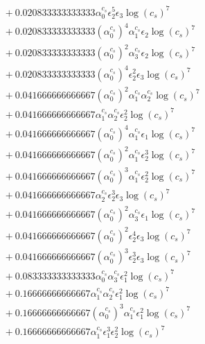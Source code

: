 \documentclass[10pt]{article}
\begin{document}
\begin{align*}
&{}  + 0.020833333333333 \alpha_{0}^{c_s} \epsilon_{2}^{5} \epsilon_{3} \log{\left(c_{s} \right)}^{7} \\
&{}  + 0.020833333333333 \left(\alpha_{0}^{c_s}\right)^{4} \alpha_{1}^{c_s} \epsilon_{2} \log{\left(c_{s} \right)}^{7} \\
&{}  + 0.020833333333333 \left(\alpha_{0}^{c_s}\right)^{2} \alpha_{3}^{c_s} \epsilon_{2} \log{\left(c_{s} \right)}^{7} \\
&{}  + 0.020833333333333 \left(\alpha_{0}^{c_s}\right)^{4} \epsilon_{2}^{2} \epsilon_{3} \log{\left(c_{s} \right)}^{7} \\
&{}  + 0.041666666666667 \left(\alpha_{0}^{c_s}\right)^{2} \alpha_{1}^{c_s} \alpha_{2}^{c_s} \log{\left(c_{s} \right)}^{7} \\
&{}  + 0.041666666666667 \alpha_{1}^{c_s} \alpha_{2}^{c_s} \epsilon_{2}^{2} \log{\left(c_{s} \right)}^{7} \\
&{}  + 0.041666666666667 \left(\alpha_{0}^{c_s}\right)^{4} \alpha_{1}^{c_s} \epsilon_{1} \log{\left(c_{s} \right)}^{7} \\
&{}  + 0.041666666666667 \left(\alpha_{0}^{c_s}\right)^{2} \alpha_{1}^{c_s} \epsilon_{2}^{3} \log{\left(c_{s} \right)}^{7} \\
&{}  + 0.041666666666667 \left(\alpha_{0}^{c_s}\right)^{3} \alpha_{1}^{c_s} \epsilon_{2}^{2} \log{\left(c_{s} \right)}^{7} \\
&{}  + 0.041666666666667 \alpha_{2}^{c_s} \epsilon_{2}^{3} \epsilon_{3} \log{\left(c_{s} \right)}^{7} \\
&{}  + 0.041666666666667 \left(\alpha_{0}^{c_s}\right)^{2} \alpha_{3}^{c_s} \epsilon_{1} \log{\left(c_{s} \right)}^{7} \\
&{}  + 0.041666666666667 \left(\alpha_{0}^{c_s}\right)^{2} \epsilon_{2}^{4} \epsilon_{3} \log{\left(c_{s} \right)}^{7} \\
&{}  + 0.041666666666667 \left(\alpha_{0}^{c_s}\right)^{3} \epsilon_{2}^{3} \epsilon_{3} \log{\left(c_{s} \right)}^{7} \\
&{}  + 0.083333333333333 \alpha_{0}^{c_s} \alpha_{3}^{c_s} \epsilon_{1}^{2} \log{\left(c_{s} \right)}^{7} \\
&{}  + 0.16666666666667 \alpha_{1}^{c_s} \alpha_{2}^{c_s} \epsilon_{1}^{2} \log{\left(c_{s} \right)}^{7} \\
&{}  + 0.16666666666667 \left(\alpha_{0}^{c_s}\right)^{3} \alpha_{1}^{c_s} \epsilon_{1}^{2} \log{\left(c_{s} \right)}^{7} \\
&{}  + 0.16666666666667 \alpha_{1}^{c_s} \epsilon_{1}^{3} \epsilon_{2}^{2} \log{\left(c_{s} \right)}^{7} \\

\end{align*}
\end{document}
